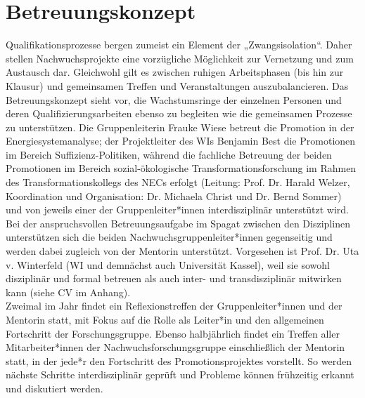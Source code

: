 \documentclass[a4paper,11pt,twoside]{scrartcl}
\begin{document}
\section{Betreuungskonzept}
Qualifikationsprozesse bergen zumeist ein Element der „Zwangsisolation“. Daher stellen Nachwuchsprojekte eine vorzügliche Möglichkeit zur Vernetzung und zum Austausch dar. Gleichwohl gilt es zwischen ruhigen Arbeitsphasen (bis hin zur Klausur) und gemeinsamen Treffen und Veranstaltungen auszubalancieren. Das Betreuungskonzept sieht vor, die Wachstumsringe der einzelnen Personen und deren Qualifizierungsarbeiten ebenso zu begleiten wie die gemeinsamen Prozesse zu unterstützen.
Die Gruppenleiterin Frauke Wiese betreut die Promotion in der Energiesystemanalyse; der Projektleiter des WIs Benjamin Best die Promotionen im Bereich Suffizienz-Politiken, während die fachliche Betreuung der beiden Promotionen im Bereich sozial-ökologische Transformationsforschung im Rahmen des Transformationskollegs des NECs erfolgt (Leitung: Prof. Dr. Harald Welzer, Koordination und Organisation: Dr. Michaela Christ und Dr. Bernd Sommer) und von jeweils einer der Gruppenleiter*innen interdisziplinär unterstützt wird. Bei der anspruchsvollen Betreuungsaufgabe im Spagat zwischen den Disziplinen unterstützen sich die beiden Nachwuchsgruppenleiter*innen gegenseitig und werden dabei zugleich von der Mentorin unterstützt. Vorgesehen ist Prof. Dr. Uta v. Winterfeld (WI und demnächst auch Universität Kassel), weil sie sowohl disziplinär und formal betreuen als auch inter- und transdisziplinär mitwirken kann (siehe CV im Anhang).\\
Zweimal im Jahr findet ein Reflexionstreffen der Gruppenleiter*innen und der Mentorin statt, mit Fokus auf die Rolle als Leiter*in und den allgemeinen Fortschritt der Forschungsgruppe. Ebenso halbjährlich findet ein Treffen aller Mitarbeiter*innen der Nachwuchsforschungsgruppe einschließlich der Mentorin statt, in der jede*r den Fortschritt des Promotionsprojektes vorstellt. So werden nächste Schritte interdisziplinär geprüft und Probleme können frühzeitig erkannt und diskutiert werden.
\end{document}
